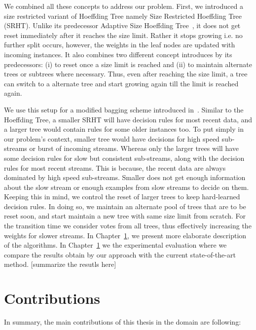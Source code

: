 We combined all these concepts to address our problem. First, we introduced a size restricted variant of Hoeffding Tree namely Size Restricted Hoeffding Tree (SRHT). Unlike its predecessor Adaptive Size Hoeffding Tree~\cite{bifet09:asht}, it does not get reset immediately after it reaches the size limit. Rather it stops growing i.e. no further split occurs, however, the weights in the leaf nodes are updated with incoming instances. It also combines two different concept introduces by its predecessors: (i) to reset once a size limit is reached and (ii) to maintain alternate trees or subtrees where necessary. Thus, even after reaching the size limit, a tree can switch to a alternate tree and start growing again till the limit is reached again. 

We use this setup for a modified bagging scheme introduced in~\cite{bifet09:asht}. Similar to the Hoeffding Tree, a smaller SRHT will have decision rules for most recent data, and a larger tree would contain rules for some older instances too. To put simply in our problem's context, smaller tree would have decisions for high speed sub-streams or burst of incoming streams. Whereas only the larger trees will have some decision rules for slow but consistent sub-streams, along with the decision rules for most recent streams. This is because, the recent data are always dominated by high speed sub-streams. Smaller does not get enough information about the slow stream or enough examples from slow streams to decide on them. Keeping this in mind, we control the reset of larger trees to keep hard-learned decision rules. In doing so, we maintain an alternate pool of trees that are to be reset soon, and start maintain a new tree with same size limit from scratch. For the transition time we consider votes from all trees, thus effectively increasing the weights for slower streams. In Chapter~\ref{}, we present more elaborate description of the algorithms. In Chapter~\ref{} we the  experimental evaluation where we compare the results obtain by our approach with the current state-of-the-art method. [summarize the resutls here]

\section{Contributions}
In summary, the main contributions of this thesis in the domain are following:

